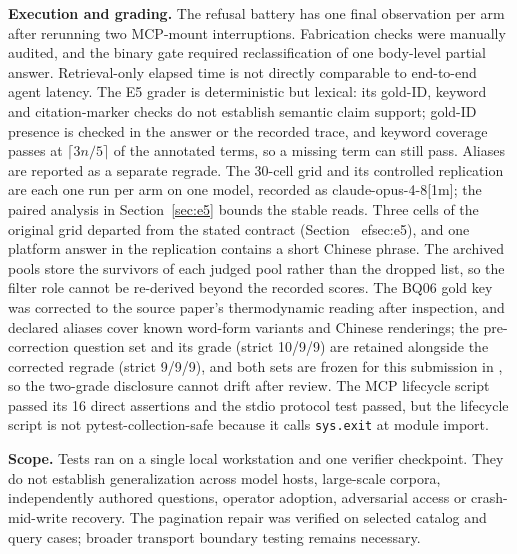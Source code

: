 \noindent\textbf{Execution and grading.} The refusal battery has one final
observation per arm after rerunning two MCP-mount interruptions. Fabrication
checks were manually audited, and the binary gate required reclassification
of one body-level partial answer. Retrieval-only elapsed time is not directly
comparable to end-to-end agent latency. The E5 grader is deterministic but
lexical: its gold-ID, keyword and citation-marker checks do not establish
semantic claim support; gold-ID presence is checked in the answer or the
recorded trace, and keyword coverage passes at $\lceil 3n/5\rceil$ of the
annotated terms, so a missing term can still pass. Aliases are reported as a
separate regrade. The 30-cell grid and its controlled replication are each one run
per arm on one model, recorded as claude-opus-4-8[1m]; the paired analysis in
Section~\ref{sec:e5} bounds the stable reads. Three cells of the original grid
departed from the stated contract (Section~
ef{sec:e5}), and one platform
answer in the replication contains a short Chinese phrase. The archived pools store the survivors of each judged pool rather
than the dropped list, so the filter role cannot be re-derived beyond the
recorded scores. The BQ06 gold key was corrected to the source paper's
thermodynamic reading after inspection, and declared aliases cover known
word-form variants and Chinese renderings; the pre-correction question set and
its grade (strict 10/9/9) are retained alongside the corrected regrade (strict
9/9/9), and both sets are frozen for this submission in
, so the
two-grade disclosure cannot drift after review. The
MCP lifecycle script passed its 16 direct assertions and the stdio protocol
test passed, but the lifecycle script is not pytest-collection-safe because it
calls \texttt{sys.exit} at module import.

{%
\noindent\textbf{Scope.} Tests ran on a single local workstation and one
verifier checkpoint. They do not establish generalization across model hosts,
large-scale corpora, independently authored questions, operator adoption,
adversarial access or crash-mid-write recovery. The pagination repair was
verified on selected catalog and query cases; broader transport boundary
testing remains necessary.

}

